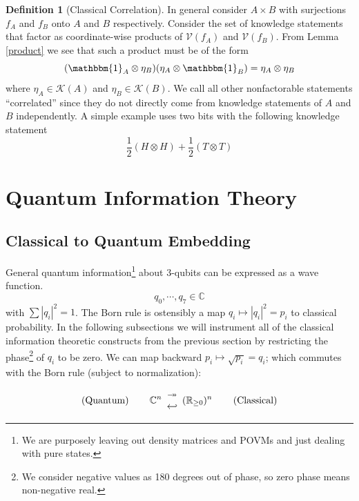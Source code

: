 \documentclass[12pt,a4paper]{article}
\theoremstyle{myrule}
\theoremstyle{postulate}
\theoremstyle{definition}
\newtheorem{definition}{Definition}[section]
\begin{document}
\begin{definition}[Classical Correlation]
\label{corrdef}
In general consider $A \times B$ with surjections $f_A$ and $f_B$ onto $A$ and $B$ respectively.  Consider the set of knowledge statements that factor as coordinate-wise products of $\mathcal{V}(f_A)$ and $\mathcal{V}(f_B)$.  From Lemma \ref{product} we see that such a product must be of the form
\[
(\mathbbm{1}_A \otimes \eta_B) (\eta_A \otimes \mathbbm{1}_B) = \eta_A \otimes \eta_B
\]
where $\eta_A \in \mathcal{K}(A)$ and $\eta_B \in \mathcal{K}(B)$.  We call all other nonfactorable statements ``correlated'' since they do not directly come from knowledge statements of $A$ and $B$ independently.  A simple example uses two bits with the following knowledge statement
\begin{equation}
\label{classiccorr}
  \frac{1}{2} (H \otimes H) + \frac{1}{2} (T \otimes T) 
\end{equation}

\end{definition}

\section{Quantum Information Theory}
\subsection{Classical to Quantum Embedding}
General quantum information\footnote{We are purposely leaving out density matrices and POVMs and just dealing with pure states.} about 3-qubits can be expressed as a wave function.
\[
   q_\mathit{0},\cdots,q_\mathit{7} \in \mathbb{C}
\]
with $\sum |q_i|^2 = 1$.  The Born rule is ostensibly a map $q_i \mapsto |q_i|^2 = p_i$ to classical probability.  In the following subsections we will instrument all of the classical information theoretic constructs from the previous section by restricting the phase\footnote{We consider negative values as 180 degrees out of phase, so zero phase means non-negative real.} of $q_i$ to be zero.  We can map backward $p_i \mapsto \sqrt{p_i} = q_i$; which commutes with the Born rule (subject to normalization):

{
\renewcommand{\arraystretch}{0.1}
\[
\text{(Quantum)} \hspace{0.3 in}
\mathbb{C}^n \begin{array}{c} \twoheadrightarrow \\ \hookleftarrow \end{array}
(\mathbb{R}_{\ge 0})^n
\hspace{0.3 in} \text{(Classical)} 
\]
}
\end{document}
